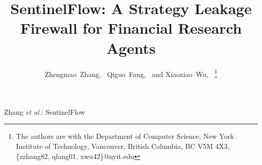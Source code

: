 \documentclass[journal]{IEEEtran}
\begin{document}

\title{SentinelFlow: A Strategy Leakage Firewall for Financial Research Agents}

\author{Zhengmao~Zhang,~
        Qiguo~Fang,~
        and Xiaoxiao~Wu,~
\thanks{The authors are with the Department of Computer Science, 
New York Institute of Technology, Vancouver,
British Columbia, BC V5M 4X3, \{zzhang82, qfang01, xwu42\}@nyit.edu}
}

{Zhang \MakeLowercase{\textit{et al.}}: SentinelFlow}
\maketitle
\end{document}
